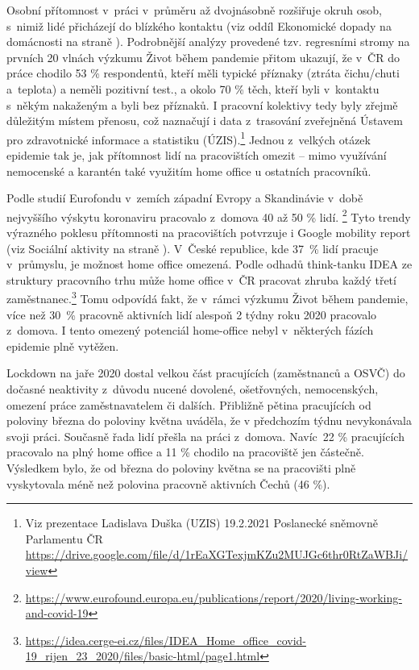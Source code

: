 Osobní přítomnost v práci v průměru až dvojnásobně rozšiřuje okruh osob, s nimiž lidé přicházejí do blízkého kontaktu (viz oddíl Ekonomické dopady na domácnosti na straně \pageref{Ekonomicke_dopady}). Podrobnější analýzy provedené tzv. regresními stromy na prvních 20 vlnách výzkumu Život během pandemie přitom ukazují, že v ČR do práce chodilo 53 \% respondentů, kteří měli typické příznaky (ztráta čichu/chuti a teplota) a neměli pozitivní test., a okolo 70 \% těch, kteří byli v kontaktu s někým nakaženým a byli bez příznaků. I pracovní kolektivy tedy byly zřejmě důležitým místem přenosu, což naznačují i data z trasování zveřejněná Ústavem pro zdravotnické informace a statistiku (ÚZIS).\footnote{Viz prezentace Ladislava Duška (UZIS) 19.2.2021 Poslanecké sněmovně Parlamentu ČR \url{https://drive.google.com/file/d/1rEaXGTexjmKZu2MUJGc6thr0RtZaWBJi/view}} Jednou z velkých otázek epidemie tak je, jak přítomnost lidí na pracovištích omezit – mimo využívání nemocenské a karantén také využitím home office u ostatních pracovníků.

Podle studií Eurofondu v zemích západní Evropy a Skandinávie v době nejvyššího výskytu koronaviru pracovalo z domova 40 až 50 \% lidí. \footnote{ \url{https://www.eurofound.europa.eu/publications/report/2020/living-working-and-covid-19}} Tyto trendy výrazného poklesu přítomnosti na pracovištích potvrzuje i Google mobility report (viz Sociální aktivity na straně \pageref{Socialni_aktivity}). V České republice, kde 37 \% lidí pracuje v průmyslu, je možnost home office omezená. Podle odhadů think-tanku IDEA ze struktury pracovního trhu může home office v ČR pracovat zhruba každý třetí zaměstnanec.\footnote{\url{https://idea.cerge-ei.cz/files/IDEA\_Home\_office\_covid-19\_rijen\_23\_2020/files/basic-html/page1.html}} Tomu odpovídá fakt, že v rámci výzkumu Život během pandemie, více než 30 \% pracovně aktivních lidí alespoň 2 týdny roku 2020 pracovalo z domova. I tento omezený potenciál home-office nebyl v některých fázích epidemie plně vytěžen.

Lockdown na jaře 2020 dostal velkou část pracujících (zaměstnanců a OSVČ) do dočasné neaktivity z důvodu nucené dovolené, ošetřovných, nemocenských, omezení práce zaměstnavatelem či dalších. Přibližně pětina pracujících od poloviny března do poloviny května uváděla, že v předchozím týdnu nevykonávala svoji práci. Současně řada lidí přešla na práci z domova. Navíc 22 \% pracujících pracovalo na plný home office a 11 \% chodilo na pracoviště jen částečně. Výsledkem bylo, že od března do poloviny května se na pracovišti plně vyskytovala méně než polovina pracovně aktivních Čechů (46 \%).

